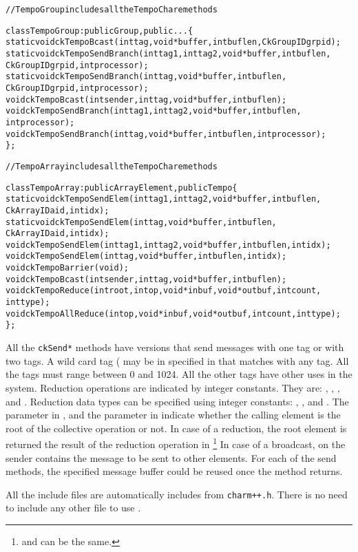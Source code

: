 \begin{alltt}
// TempoGroup includes all the TempoChare methods

class TempoGroup : public Group, public ... \{
  static void ckTempoBcast(int tag, void *buffer, int buflen, CkGroupID grpid);
  static void ckTempoSendBranch(int tag1, int tag2, void *buffer, int buflen,
                                CkGroupID grpid, int processor);
  static void ckTempoSendBranch(int tag, void *buffer, int buflen,
                                CkGroupID grpid, int processor);
  void ckTempoBcast(int sender, int tag, void *buffer, int buflen);
  void ckTempoSendBranch(int tag1, int tag2, void *buffer, int buflen,
                         int processor);
  void ckTempoSendBranch(int tag, void *buffer, int buflen, int processor);
\};
\end{alltt}

\begin{alltt}
// TempoArray includes all the TempoChare methods

class TempoArray : public ArrayElement, public Tempo \{
  static void ckTempoSendElem(int tag1, int tag2, void *buffer, int buflen,
                              CkArrayID aid, int idx);
  static void ckTempoSendElem(int tag, void *buffer, int buflen,
                              CkArrayID aid, int idx);
  void ckTempoSendElem(int tag1, int tag2, void *buffer, int buflen, int idx);
  void ckTempoSendElem(int tag, void *buffer, int buflen, int idx);
  void ckTempoBarrier(void);
  void ckTempoBcast(int sender, int tag, void *buffer, int buflen);
  void ckTempoReduce(int root, int op, void *inbuf, void *outbuf, int count,
                     int type);
  void ckTempoAllReduce(int op,void *inbuf,void *outbuf,int count,int type);
\};
\end{alltt}

All the {\tt ckSend*} methods have versions that send messages with one tag or
with two tags. A wild card tag ( may be in specified in 
 that matches with any tag. All the tags must range between 
0 and 1024. All the other tags have other uses in the system. 
Reduction operations are indicated by integer constants.
They are: , , , and 
.
Reduction data types can be specified using integer constants: 
, , and . 
The  parameter in ,
and the  parameter in  indicate whether the 
calling element is the root of the collective operation or not. 
In case of a reduction,
the root element is returned the result of the reduction operation in
\footnote{ and  can be the same.} 
In case of a broadcast,  on the sender contains the message 
to be sent to other elements.
For each of the send methods, the specified message buffer could be reused once
the method returns.

All the \tempo{} include files are automatically includes from {\tt charm++.h}.
There is no need to include any other file to use \tempo{}.
